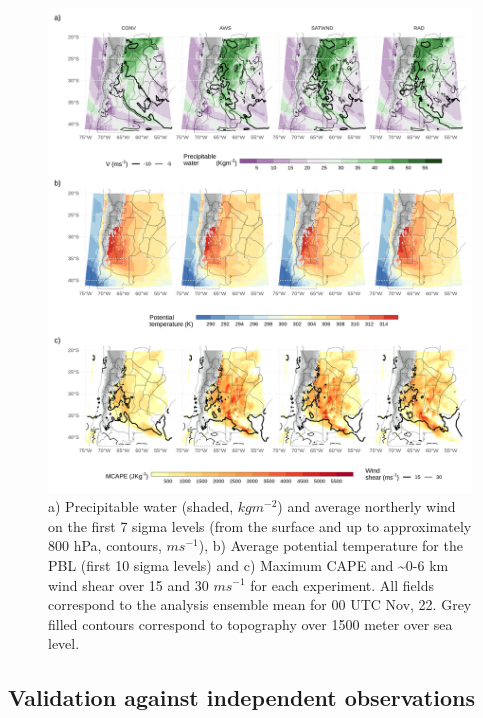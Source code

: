 \documentclass[final,5p,times,twocolumn,authoryear]{elsarticle} %
\begin{document}
\begin{figure}
\includegraphics[width=1\linewidth]{../figures/summary-fields-1} \caption{a) Precipitable water (shaded, \(kgm^{-2}\)) and average northerly wind on the first 7 sigma levels (from the surface and up to approximately 800 hPa, contours, \(ms^{-1}\)), b) Average potential temperature for the PBL (first 10 sigma levels) and c) Maximum CAPE and \textasciitilde0-6 km wind shear over 15 and 30 \(ms^{-1}\) for each experiment. All fields correspond to the analysis ensemble mean for 00 UTC Nov, 22. Grey filled contours correspond to topography over 1500 meter over sea level.}\label{fig:summary-fields}
\end{figure}

\hypertarget{validation-against-independent-observations}{%
\subsection{Validation against independent observations}\label{validation-against-independent-observations}}
\end{document}
